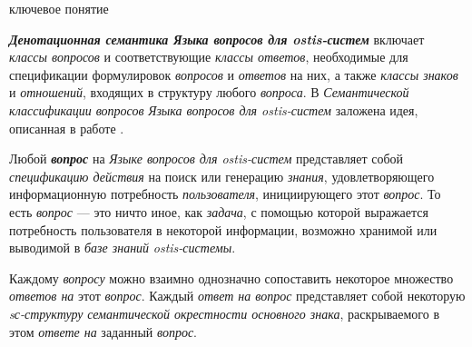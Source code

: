 \begin{SCn}
\begin{scnrelfromlist}{ключевое понятие}
\end{scnrelfromlist}
\end{SCn}

\textbf{\textit{Денотационная семантика Языка вопросов для ostis-систем}} включает \textit{классы вопросов} и соответствующие \textit{классы ответов}, необходимые для спецификации формулировок \textit{вопросов} и \textit{ответов} на них, а также \textit{классы знаков} и \textit{отношений}, входящих в структуру любого \textit{вопроса}. В \textit{Семантической классификации вопросов} \textit{Языка вопросов для ostis-систем} заложена идея, описанная в работе .

Любой \textbf{\textit{вопрос}} на \textit{Языке вопросов для ostis-систем} представляет собой \textit{спецификацию действия} на поиск или генерацию \textit{знания}, удовлетворяющего информационную потребность \textit{пользователя}, инициирующего этот \textit{вопрос}. То есть \textit{вопрос} --- это ничто иное, как \textit{задача}, с помощью которой выражается потребность пользователя в некоторой информации, возможно хранимой или выводимой в \textit{базе знаний} \textit{ostis-системы}. 

Каждому \textit{вопросу} можно взаимно однозначно сопоставить некоторое множество \textit{ответов на} этот \textit{вопрос}. Каждый \textit{ответ на вопрос} представляет собой некоторую \textit{sс-структуру} \textit{семантической окрестности основного знака}, раскрываемого в этом \textit{ответе на} заданный \textit{вопрос}.

\begin{SCn}

\end{SCn}

